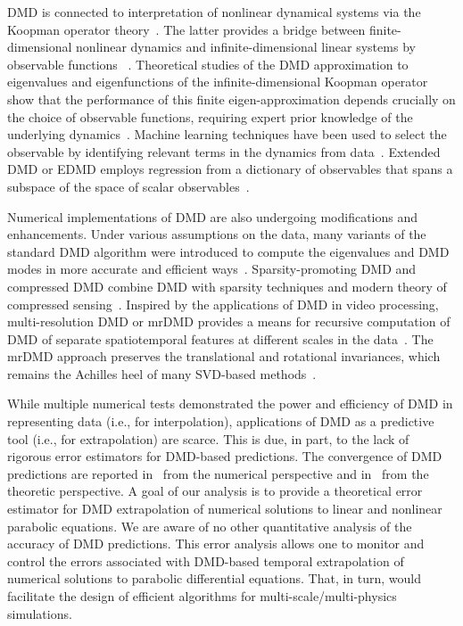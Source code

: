 \documentclass[10pt]{article}
\numberwithin{equation}{section}
\theoremstyle{plain}
\theoremstyle{remark}
\theoremstyle{remark}
\begin{document}
DMD is connected to interpretation of nonlinear dynamical systems via the Koopman operator theory~\cite{rowley2009spectral,mezic2013analysis}. The latter provides a bridge between finite-dimensional nonlinear dynamics and infinite-dimensional linear systems by observable functions ~\cite{koopman1931hamiltonian}. Theoretical studies of the DMD approximation to eigenvalues and eigenfunctions of the infinite-dimensional Koopman operator show that the performance of this finite eigen-approximation depends crucially on the choice of observable functions, requiring expert prior knowledge of the underlying dynamics~\cite{rowley2009spectral,williams2015data}. Machine learning techniques have been used to select the observable by identifying relevant terms in the dynamics from data~\cite{brunton2016discovering,schmidt2009distilling,wang2011predicting}. Extended DMD or EDMD employs regression from a dictionary of observables that spans a subspace of the space of scalar observables~\cite{williams2015data}.

Numerical implementations of DMD are also undergoing modifications and enhancements. Under various assumptions on the data, many variants of the standard DMD algorithm were introduced to compute the eigenvalues and DMD modes in more accurate and efficient ways~\cite{dawson2016characterizing, drmac2018data}. Sparsity-promoting DMD and compressed DMD combine DMD with sparsity techniques and modern theory of compressed sensing~\cite{brunton2015compressed,tu2014spectral}.  Inspired by the applications of DMD in video processing, multi-resolution DMD or mrDMD provides a means for recursive computation of DMD of separate spatiotemporal features at different scales in the data~\cite{kutz2016multiresolution}. The mrDMD approach preserves the translational and rotational invariances, which remains the Achilles heel of many SVD-based methods~\cite{rowley2000reconstruction}.

While multiple numerical tests demonstrated the power and efficiency of DMD in representing data (i.e., for interpolation), applications of DMD as a predictive tool (i.e., for extrapolation) are scarce. This is due, in part, to the lack of rigorous error estimators for DMD-based predictions. The convergence of DMD predictions are reported in~\cite{duke2012error} from the numerical perspective and in~\cite{korda2018convergence} from the theoretic perspective. A goal of our analysis is to provide a theoretical error estimator for DMD extrapolation of numerical solutions to linear and nonlinear parabolic equations. We are aware of no other quantitative analysis of the accuracy of DMD predictions. This error analysis allows one to monitor and control the errors associated with DMD-based temporal extrapolation of  numerical solutions to parabolic differential equations. That, in turn, would facilitate the design of efficient algorithms for multi-scale/multi-physics simulations.
\end{document}
